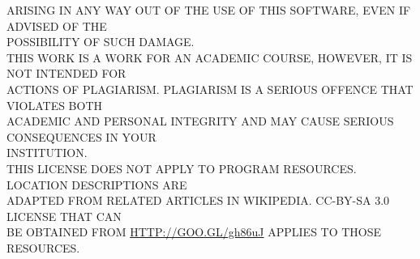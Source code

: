 {ARISING IN ANY WAY OUT OF THE USE OF THIS SOFTWARE, EVEN IF ADVISED OF THE \\
POSSIBILITY OF SUCH DAMAGE. \\
THIS WORK IS A WORK FOR AN ACADEMIC COURSE, HOWEVER, IT IS NOT INTENDED FOR \\
ACTIONS OF PLAGIARISM. PLAGIARISM IS A SERIOUS OFFENCE THAT VIOLATES BOTH \\
ACADEMIC AND PERSONAL INTEGRITY AND MAY CAUSE SERIOUS CONSEQUENCES IN YOUR \\
INSTITUTION. \\
THIS LICENSE DOES NOT APPLY TO PROGRAM RESOURCES. LOCATION DESCRIPTIONS ARE \\
ADAPTED FROM RELATED ARTICLES IN WIKIPEDIA. CC-BY-SA 3.0 LICENSE THAT CAN \\
BE OBTAINED FROM \url{HTTP://GOO.GL/gh86uJ} APPLIES TO THOSE RESOURCES.
}
